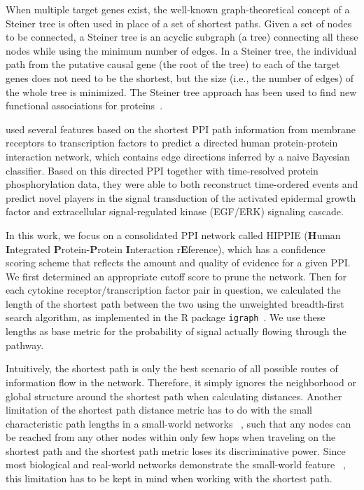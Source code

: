 When multiple target genes exist, the well-known graph-theoretical concept of a Steiner tree is often used in place of a set of shortest paths. Given a set of nodes to be connected, a Steiner tree is an acyclic subgraph (a tree) connecting all these nodes while using the minimum number of edges. In a Steiner tree, the individual path from the putative causal gene (the root of the tree) to each of the target genes does not need to be the shortest, but the size (i.e., the number of edges) of the whole tree is minimized. The Steiner tree approach has been used to find new functional associations for proteins~\citep{Huang2009,Bailly-Bechet2011}.

\cite{Vinayagam2011} used several features based on the shortest PPI path 
information from membrane receptors to transcription factors to
predict a directed human protein-protein interaction 
network, which contains edge directions
inferred by a naive Bayesian classifier.
Based on this directed PPI together with time-resolved protein phosphorylation data,
they were able to both reconstruct time-ordered events and
predict novel players in the signal transduction of the activated epidermal growth factor and extracellular signal-regulated kinase (EGF/ERK) signaling cascade.

In this work, we focus on a consolidated PPI network called HIPPIE 
(\textbf{H}uman \textbf{I}ntegrated \textbf{P}rotein-\textbf{P}rotein 
\textbf{I}nteraction r\textbf{E}ference), which has a confidence scoring 
scheme that reflects the amount and quality of evidence for a given PPI. 
We first determined an appropriate cutoff score to prune the network.
Then for each cytokine receptor/transcription factor pair in question,
we calculated the length of the shortest path between the two
using the unweighted breadth-first search algorithm,
as implemented in the R package \texttt{igraph}~\citep{Csardi2006}.
We use these lengths as base metric for the probability 
of signal actually flowing through the pathway.

Intuitively, the shortest path is only the best scenario of all possible routes
of information flow in the network. Therefore, it simply ignores the 
neighborhood or global structure around the shortest path when calculating
distances. Another limitation of the shortest path distance metric has to do
with the small characteristic path lengths in a small-world networks~%
\citep{Watts1998}, such that any nodes can be reached from any other nodes
within only few hops when traveling on the shortest path and the shortest path
metric loses its discriminative power. Since most biological
and real-world networks demonstrate the small-world feature~%
\citep{Barabasi2004}, this limitation
has to be kept in mind when working with the shortest path.

